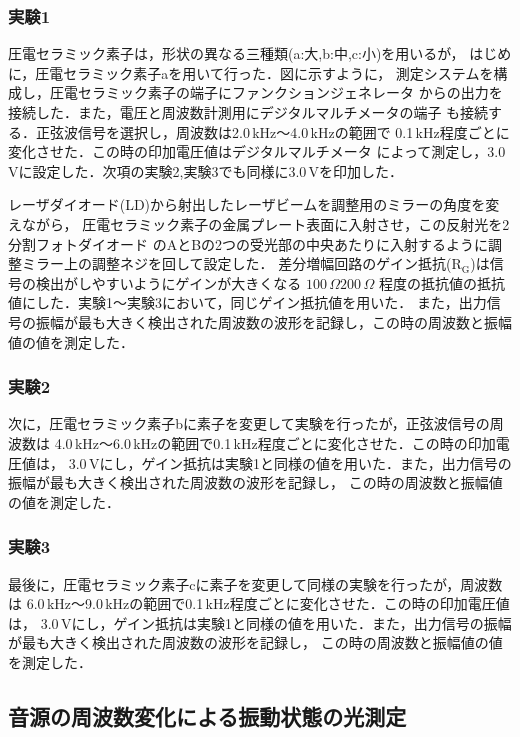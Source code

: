 \documentclass{ltjsarticle}
\begin{document}
		\subsubsection{実験1}
			圧電セラミック素子は，形状の異なる三種類(a:大,b:中,c:小)を用いるが，
			はじめに，圧電セラミック素子aを用いて行った．図に示すように，
			測定システムを構成し，圧電セラミック素子の端子にファンクションジェネレータ
			からの出力を接続した．また，電圧と周波数計測用にデジタルマルチメータの端子
			も接続する．正弦波信号を選択し，周波数は2.0\,kHz～4.0\,kHzの範囲で
			0.1\,kHz程度ごとに変化させた．この時の印加電圧値はデジタルマルチメータ
			によって測定し，3.0\,Vに設定した．次項の実験2,実験3でも同様に3.0\,Vを印加した．

			レーザダイオード(LD)から射出したレーザビームを調整用のミラーの角度を変えながら，
			圧電セラミック素子の金属プレート表面に入射させ，この反射光を2分割フォトダイオード
			のAとBの2つの受光部の中央あたりに入射するように調整ミラー上の調整ネジを回して設定した．
			差分増幅回路のゲイン抵抗($\mathrm{R_G}$)は信号の検出がしやすいようにゲインが大きくなる
			$100\,\Omega 200\,\Omega$ 程度の抵抗値の抵抗値にした．実験1～実験3において，同じゲイン抵抗値を用いた．
			また，出力信号の振幅が最も大きく検出された周波数の波形を記録し，この時の周波数と振幅値の値を測定した．

		\subsubsection{実験2}
			次に，圧電セラミック素子bに素子を変更して実験を行ったが，正弦波信号の周波数は
			4.0\,kHz～6.0\,kHzの範囲で0.1\,kHz程度ごとに変化させた．この時の印加電圧値は，
			3.0\,Vにし，ゲイン抵抗は実験1と同様の値を用いた．また，出力信号の振幅が最も大きく検出された周波数の波形を記録し，
			この時の周波数と振幅値の値を測定した．

		\subsubsection{実験3}
			最後に，圧電セラミック素子cに素子を変更して同様の実験を行ったが，周波数は
			6.0\,kHz～9.0\,kHzの範囲で0.1\,kHz程度ごとに変化させた．この時の印加電圧値は，
			3.0\,Vにし，ゲイン抵抗は実験1と同様の値を用いた．また，出力信号の振幅が最も大きく検出された周波数の波形を記録し，
			この時の周波数と振幅値の値を測定した．

	\subsection{音源の周波数変化による振動状態の光測定}
\end{document}
